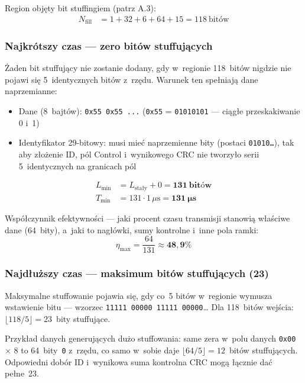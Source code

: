 \documentclass[12pt,a4paper]{article}
\begin{document}
Region objęty bit stuffingiem (patrz A.3):
\begin{align*}
N_{\text{fill}} &= 1 + 32 + 6 + 64 + 15 = 118\ \text{bitów}
\end{align*}

\subsubsection*{Najkrótszy czas — zero bitów stuffujących}

Żaden bit stuffujący nie zostanie dodany, gdy w~regionie 118~bitów nigdzie
nie pojawi się 5~identycznych bitów z~rzędu. Warunek ten spełniają dane
naprzemianne:
\begin{itemize}
    \item Dane (8~bajtów): \texttt{0x55 0x55 ...} (\texttt{0x55} =
          \texttt{01010101} — ciągłe przeskakiwanie 0 i~1)
    \item Identyfikator 29-bitowy: musi mieć naprzemienne bity
          (postaci \texttt{01010\ldots}), tak aby złożenie ID, pól Control
          i~wynikowego CRC nie tworzyło serii 5~identycznych na granicach pól
\end{itemize}

\begin{align*}
L_{\min} &= L_{\text{stały}} + 0 = \mathbf{131\ \text{bitów}} \\
T_{\min} &= 131 \cdot 1\,\mu\text{s} = \mathbf{131\ \mu\text{s}}
\end{align*}

Współczynnik efektywności — jaki procent czasu transmisji stanowią właściwe
dane (64~bity), a~jaki to nagłówki, sumy kontrolne i~inne pola ramki:
\begin{equation}
\eta_{\max} = \frac{64}{131} \approx \mathbf{48{,}9\%}
\end{equation}

\subsubsection*{Najdłuższy czas — maksimum bitów stuffujących (23)}

Maksymalne stuffowanie pojawia się, gdy co~5 bitów w~regionie wymusza
wstawienie bitu — wzorzec \texttt{11111\,00000\,11111\,00000}\ldots
Dla 118~bitów wejścia: $\lfloor 118 / 5 \rfloor = 23$~bity stuffujące.

Przykład danych generujących dużo stuffowania: same zera w~polu danych
\texttt{0x00} $\times$ 8 to 64~bity~\texttt{0} z~rzędu, co samo w~sobie daje
$\lfloor 64/5 \rfloor = 12$~bitów stuffujących. Odpowiedni dobór ID i~wynikowa
suma kontrolna CRC mogą łącznie dać pełne~23.
\end{document}
